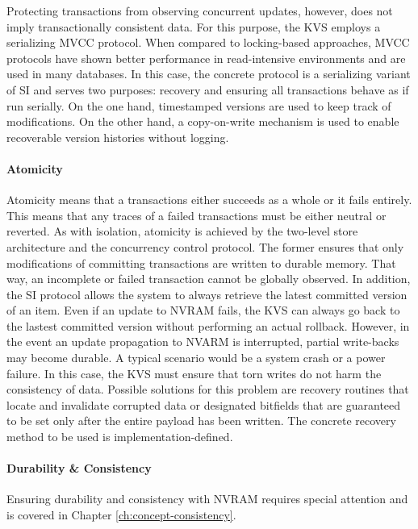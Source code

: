 Protecting transactions from observing concurrent updates, however, does not
imply transactionally consistent data. For this purpose, the KVS employs a
serializing MVCC protocol. When compared to locking-based approaches, MVCC
protocols have shown better performance in read-intensive environments and are
used in many databases. In this case, the concrete protocol is a serializing
variant of SI and serves two purposes: recovery and ensuring all transactions
behave as if run serially. On the one hand, timestamped versions are used to
keep track of modifications. On the other hand, a copy-on-write mechanism is
used to enable recoverable version histories without logging.

\paragraph{Atomicity}

Atomicity means that a transactions either succeeds as a whole or it fails
entirely. This means that any traces of a failed transactions must be either
neutral or reverted. As with isolation, atomicity is achieved by the two-level
store architecture and the concurrency control protocol. The former ensures that
only modifications of committing transactions are written to durable memory.
That way, an incomplete or failed transaction cannot be globally observed. In
addition, the SI protocol allows the system to always retrieve the latest
committed version of an item. Even if an update to NVRAM fails, the KVS can
always go back to the lastest committed version without performing an actual
rollback. However, in the event an update propagation to NVARM is interrupted,
partial write-backs may become durable. A typical scenario would be a system
crash or a power failure. In this case, the KVS must ensure that torn writes
do not harm the consistency of data. Possible solutions for this problem are
recovery routines that locate and invalidate corrupted data or designated
bitfields that are guaranteed to be set only after the entire payload has been
written. The concrete recovery method to be used is implementation-defined.

\paragraph{Durability \& Consistency}

Ensuring durability and consistency with NVRAM requires special attention and is
covered in Chapter \ref{ch:concept-consistency}.

